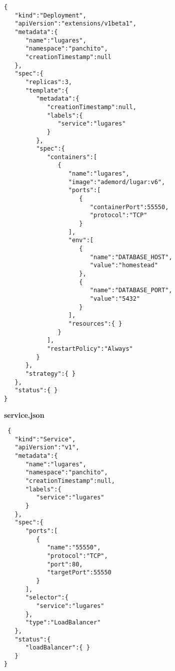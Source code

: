 \begin{mdframed}[linecolor=black, topline=true, bottomline=true,
  leftline=false, rightline=false, backgroundcolor=LightGray,userdefinedwidth=\textwidth]
  \begin{verbatim}
{  
   "kind":"Deployment",
   "apiVersion":"extensions/v1beta1",
   "metadata":{  
      "name":"lugares",
      "namespace":"panchito",
      "creationTimestamp":null
   },
   "spec":{  
      "replicas":3,
      "template":{  
         "metadata":{  
            "creationTimestamp":null,
            "labels":{  
               "service":"lugares"
            }
         },
         "spec":{  
            "containers":[  
               {  
                  "name":"lugares",
                  "image":"ademord/lugar:v6",
                  "ports":[  
                     {  
                        "containerPort":55550,
                        "protocol":"TCP"
                     }
                  ],
                  "env":[  
                     {  
                        "name":"DATABASE_HOST",
                        "value":"homestead"
                     },
                     {  
                        "name":"DATABASE_PORT",
                        "value":"5432"
                     }
                  ],
                  "resources":{ }
               }
            ],
            "restartPolicy":"Always"
         }
      },
      "strategy":{ }
   },
   "status":{ }
}
\end{verbatim}
\end{mdframed}

{ \sffamily \textbf{service.json} }
\begin{mdframed}[linecolor=black, topline=true, bottomline=true,
  leftline=false, rightline=false, backgroundcolor=LightGray,userdefinedwidth=\textwidth]
  \begin{verbatim}
 {  
   "kind":"Service",
   "apiVersion":"v1",
   "metadata":{  
      "name":"lugares",
      "namespace":"panchito",
      "creationTimestamp":null,
      "labels":{  
         "service":"lugares"
      }
   },
   "spec":{  
      "ports":[  
         {  
            "name":"55550",
            "protocol":"TCP",
            "port":80,
            "targetPort":55550
         }
      ],
      "selector":{  
         "service":"lugares"
      },
      "type":"LoadBalancer"
   },
   "status":{  
      "loadBalancer":{ }
   }
}
\end{verbatim}
\end{mdframed}

